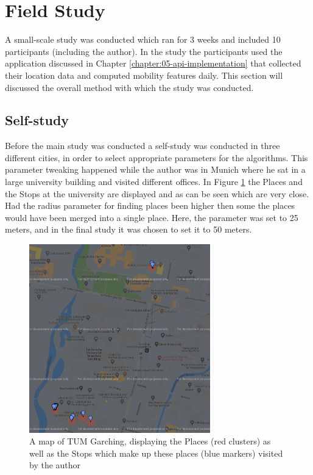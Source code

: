 \section{Field Study}
A small-scale study was conducted which ran for 3 weeks and included 10 participants (including the author). In the study the participants used the application discussed in Chapter \ref{chapter:05-api-implementation} that collected their location data and computed mobility features daily. This section will discussed the overall method with which the study was conducted.


\subsection{Self-study}
Before the main study was conducted a self-study was conducted in three different cities, in order to select appropriate parameters for the algorithms. This parameter tweaking happened while the author was in Munich where he sat in a large university building and visited different offices. In Figure \ref{fig:tum-map} the Places and the Stops at the university are displayed and as can be seen which are very close. Had the radius parameter for finding places been higher then some the places would have been merged into a single place. Here, the parameter was set to 25 meters, and in the final study it was chosen to set it to 50 meters.

\begin{figure}
    \centering
    \includegraphics[width=0.7\textwidth]{images/map/map-tum.png}
    \caption{A map of TUM Garching, displaying the Places (red clusters) as well as the Stops which make up these places (blue markers) visited by the author}
    \label{fig:tum-map}
\end{figure}

